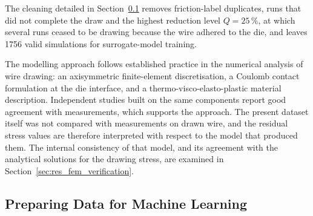 \documentclass[subscriptcorrection,upint,varvw,barcolor=Goldenrod3,mathalfa=cal=euler,balance,hyphenate,french,pdf-a]{asmejour} %
\begin{document}
The cleaning detailed in Section~\ref{sec:prep-data} removes friction-label duplicates, runs that did not complete the draw and the highest reduction level $Q=25\,\%$, at which several runs ceased to be drawing because the wire adhered to the die, and leaves 1756 valid simulations for surrogate-model training.

The modelling approach follows established practice in the numerical analysis of wire drawing: an axisymmetric finite-element discretisation, a Coulomb contact formulation at the die interface, and a thermo-visco-elasto-plastic material description. Independent studies built on the same components \citep{shin2026accurate,he2003residual,overstam2006influence,selbmann2024residual} report good agreement with measurements, which supports the approach. The present dataset itself was not compared with measurements on drawn wire, and the residual stress values are therefore interpreted with respect to the model that produced them. The internal consistency of that model, and its agreement with the analytical solutions for the drawing stress, are examined in Section~\ref{sec:res_fem_verification}.


\subsection{Preparing Data for Machine Learning}
\label{sec:prep-data}
\label{sec:fem-dataset}  %


\end{document}
